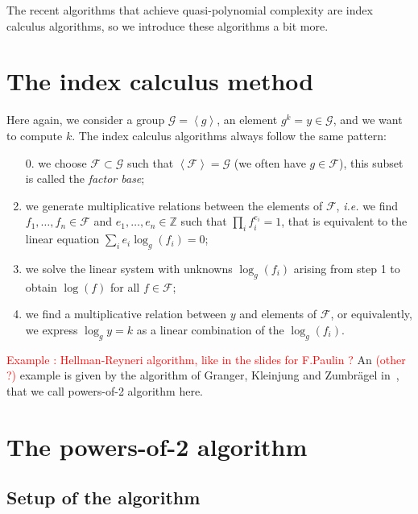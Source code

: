 \documentclass[a4paper,11pt]{article}
\theoremstyle{break}
\theoremstyle{sc}
\theoremstyle{definition}
\theoremstyle{remark}
\newcommand{\ie}{\emph{i.e. }}
\begin{document}
The recent algorithms that achieve quasi-polynomial complexity are index
calculus algorithms, so we introduce these algorithms a bit more.

\section{The index calculus method}

Here again, we consider a group $\mathcal G=\left\langle g \right\rangle$, an element
$g^k = y\in \mathcal G$, and we want to compute $k$. The index calculus algorithms always
follow the same pattern:
\begin{enumerate}
  \item[0.] we choose $\mathcal F\subset \mathcal G$ such that $\left\langle
    \mathcal F \right\rangle = \mathcal G$
    (we often have $g\in \mathcal F$), this subset is called the \emph{factor base};
  \item we generate multiplicative relations between the elements of $\mathcal F$, \ie we
    find $f_1, \dots, f_n \in \mathcal F$ and $e_1, \dots, e_n\in \mathbb{Z}$ such that
    $\prod_i f_i^{e_i} = 1$, that is equivalent to the linear equation $\sum_i
    e_i\log_g(f_i) = 0$;
  \item we solve the linear system with unknowns $\log_g(f_i)$ arising from step
    1 to obtain $\log(f)$ for all $f\in \mathcal F$;
  \item we find a multiplicative relation between $y$ and elements of $\mathcal F$, or
    equivalently, we express $\log_g y = k$ as a linear combination of the
  $\log_g(f_i)$.
\end{enumerate}
\textcolor{red}{Example : Hellman-Reyneri algorithm, like in the slides for
  F.Paulin ?}
  \newline
  \newline
  An \textcolor{red}{(other ?)} example is given by the algorithm of Granger,
  Kleinjung and Zumbrägel in~\cite{GKZ14}, that we call powers-of-2 algorithm here.
\section{The powers-of-2 algorithm}
\subsection{Setup of the algorithm}
\end{document}
